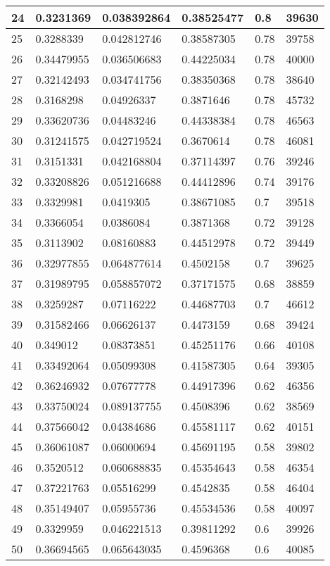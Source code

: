 \begin{longtable}{|l|l|l|l|l|l|}
24 & 0.3231369 & 0.038392864 & 0.38525477 & 0.8 & 39630 \\ \hline 
25 & 0.3288339 & 0.042812746 & 0.38587305 & 0.78 & 39758 \\ \hline 
26 & 0.34479955 & 0.036506683 & 0.44225034 & 0.78 & 40000 \\ \hline 
27 & 0.32142493 & 0.034741756 & 0.38350368 & 0.78 & 38640 \\ \hline 
28 & 0.3168298 & 0.04926337 & 0.3871646 & 0.78 & 45732 \\ \hline 
29 & 0.33620736 & 0.04483246 & 0.44338384 & 0.78 & 46563 \\ \hline 
30 & 0.31241575 & 0.042719524 & 0.3670614 & 0.78 & 46081 \\ \hline 
31 & 0.3151331 & 0.042168804 & 0.37114397 & 0.76 & 39246 \\ \hline 
32 & 0.33208826 & 0.051216688 & 0.44412896 & 0.74 & 39176 \\ \hline 
33 & 0.3329981 & 0.0419305 & 0.38671085 & 0.7 & 39518 \\ \hline 
34 & 0.3366054 & 0.0386084 & 0.3871368 & 0.72 & 39128 \\ \hline 
35 & 0.3113902 & 0.08160883 & 0.44512978 & 0.72 & 39449 \\ \hline 
36 & 0.32977855 & 0.064877614 & 0.4502158 & 0.7 & 39625 \\ \hline 
37 & 0.31989795 & 0.058857072 & 0.37171575 & 0.68 & 38859 \\ \hline 
38 & 0.3259287 & 0.07116222 & 0.44687703 & 0.7 & 46612 \\ \hline 
39 & 0.31582466 & 0.06626137 & 0.4473159 & 0.68 & 39424 \\ \hline 
40 & 0.349012 & 0.08373851 & 0.45251176 & 0.66 & 40108 \\ \hline 
41 & 0.33492064 & 0.05099308 & 0.41587305 & 0.64 & 39305 \\ \hline 
42 & 0.36246932 & 0.07677778 & 0.44917396 & 0.62 & 46356 \\ \hline 
43 & 0.33750024 & 0.089137755 & 0.4508396 & 0.62 & 38569 \\ \hline 
44 & 0.37566042 & 0.04384686 & 0.45581117 & 0.62 & 40151 \\ \hline 
45 & 0.36061087 & 0.06000694 & 0.45691195 & 0.58 & 39802 \\ \hline 
46 & 0.3520512 & 0.060688835 & 0.45354643 & 0.58 & 46354 \\ \hline 
47 & 0.37221763 & 0.05516299 & 0.4542835 & 0.58 & 46404 \\ \hline 
48 & 0.35149407 & 0.05955736 & 0.45534536 & 0.58 & 40097 \\ \hline 
49 & 0.3329959 & 0.046221513 & 0.39811292 & 0.6 & 39926 \\ \hline 
50 & 0.36694565 & 0.065643035 & 0.4596368 & 0.6 & 40085 \\ \hline 
\end{longtable}